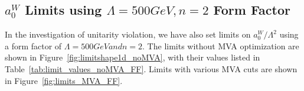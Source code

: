 \subsection{$a_{0}^{W}$ Limits using $\Lambda = 500 GeV, n = 2$ Form Factor}
In the investigation of unitarity violation, we have also set limits on
$a_{0}^{W}/\Lambda^{2}$ using a form factor of $\Lambda = 500 GeV and n = 2$.
The limits without MVA optimization are shown in Figure~\ref{fig:limitshape1d_noMVA},
with their values listed in Table~\ref{tab:limit_values_noMVA_FF}. Limits with 
various MVA cuts are shown in Figure~\ref{fig:limits_MVA_FF}.

\begin{table}[htb]
\centering
{}
  \caption{95\% CL shape-based exclusion limits listed for both the muon and electron channels of each AQGC parameter $a_{0}^{W}/\Lambda^{2}$, with a Form Factor of $\Lambda = 500 GeV, n = 2$, using photon $p_{T}$ and without MVA optimization.}
  \label{tab:limit_values_noMVA_FF}
\end{table}
